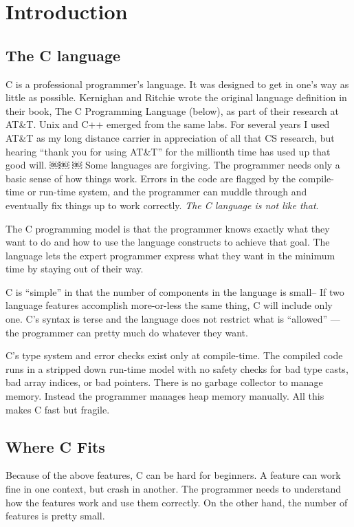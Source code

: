 \chapter{Introduction}

\section{The C language}

C is a professional programmer's language. It was designed to get in one's way as little as possible. Kernighan and Ritchie wrote the original language definition in their book, The C Programming Language (below), as part of their research at AT\&T. Unix and C++ emerged from the same labs. For several years I used AT\&T as my long distance carrier in appreciation of all that CS research, but hearing ``thank you for using AT\&T'' for the millionth time has used up that good will.
￼￼
￼
Some languages are forgiving. The programmer needs only a basic sense of how things work. Errors in the code are flagged by the compile-time or run-time system, and the programmer can muddle through and eventually fix things up to work correctly. \textit{The C language is not like that}.

The C programming model is that the programmer knows exactly what they want to do and how to use the language constructs to achieve that goal. The language lets the expert programmer express what they want in the minimum time by staying out of their way.

C is ``simple'' in that the number of components in the language is small-- If two language features accomplish more-or-less the same thing, C will include only one. C's syntax is terse and the language does not restrict what is ``allowed'' --- the programmer can pretty much do whatever they want.

C's type system and error checks exist only at compile-time. The compiled code runs in a stripped down run-time model with no safety checks for bad type casts, bad array indices, or bad pointers. There is no garbage collector to manage memory. Instead the programmer manages heap memory manually. All this makes C fast but fragile.


\section{Where C Fits}

Because of the above features, C can be hard for beginners. A feature can work fine in one context, but crash in another. The programmer needs to understand how the features work and use them correctly. On the other hand, the number of features is pretty small.

